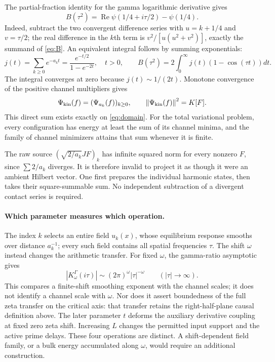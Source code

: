 \documentclass[11pt]{article}
\numberwithin{equation}{section}
\theoremstyle{definition}
\theoremstyle{remark}
\newcommand{\re}{\operatorname{Re}}
\newcommand{\norm}[1]{\left\lVert#1\right\rVert}
\begin{document}
The partial-fraction identity for the gamma logarithmic derivative gives
\begin{equation}
 B(\tau^2)=\re\psi(1/4+i\tau/2)-\psi(1/4).
 \label{eq:digamma}
\end{equation}
Indeed, subtract the two convergent difference series with $u=k+1/4$ and $v=\tau/2$; the real difference in the $k$th term is $v^2/[u(u^2+v^2)]$, exactly the summand of \eqref{eq:B}. An equivalent integral follows by summing exponentials:
\begin{equation}
 j(t)=\sum_{k\ge0}e^{-a_kt}
 =\frac{e^{-t/2}}{1-e^{-2t}},\quad t>0,
 \qquad B(\tau^2)=2\int_0^\infty j(t)(1-\cos(\tau t))dt.
 \label{eq:j}
\end{equation}
The integral converges at zero because $j(t)\sim1/(2t)$. Monotone convergence of the positive channel multipliers gives
\begin{equation}
 \Psi_{\rm kin}(f)=(\Psi_{a_k}(f))_{k\ge0},\qquad
 \norm{\Psi_{\rm kin}(f)}^2=K[F].
 \label{eq:tower}
\end{equation}
This direct sum exists exactly on \eqref{eq:domain}. For the total variational problem, every configuration has energy at least the sum of its channel minima, and the family of channel minimizers attains that sum whenever it is finite.

The raw source $(\sqrt{2/a_k}JF)_k$ has infinite squared norm for every nonzero $F$, since $\sum2/a_k$ diverges. It is therefore invalid to project it as though it were an ambient Hilbert vector. One first prepares the individual harmonic states, then takes their square-summable sum. No independent subtraction of a divergent contact series is required.

\paragraph{Which parameter measures which operation.}
The index $k$ selects an entire field $u_k(x)$, whose equilibrium response smooths over distance $a_k^{-1}$; every such field contains all spatial frequencies $\tau$. The shift $\omega$ instead changes the arithmetic transfer. For fixed $\omega$, the gamma-ratio asymptotic gives
\[
|K^\Gamma_\omega(i\tau)|\sim(2\pi)^\omega|\tau|^{-\omega}
\qquad (|\tau|\to\infty).
\]
This compares a finite-shift smoothing exponent with the channel scales; it does not identify a channel scale with $\omega$. Nor does it assert boundedness of the full zeta transfer on the critical axis: that transfer retains the right-half-plane causal definition above. The later parameter $t$ deforms the auxiliary derivative coupling at fixed zero zeta shift. Increasing $L$ changes the permitted input support and the active prime delays. These four operations are distinct. A shift-dependent field family, or a bulk energy accumulated along $\omega$, would require an additional construction.
\end{document}
